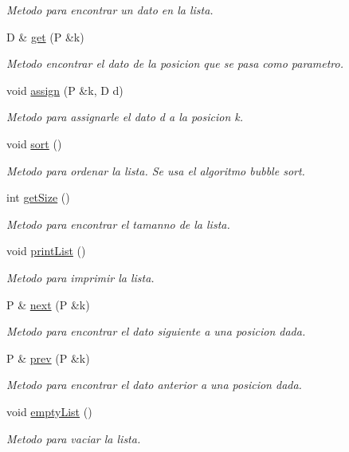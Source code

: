 \begin{DoxyCompactItemize}
\begin{DoxyCompactList}\small\item\em Metodo para encontrar un dato en la lista. \end{DoxyCompactList}\item 
D \& \hyperlink{classListWithArray_a716a279651d30b3fca9df3506ed77535}{get} (P \&k)
\begin{DoxyCompactList}\small\item\em Metodo encontrar el dato de la posicion que se pasa como parametro. \end{DoxyCompactList}\item 
void \hyperlink{classListWithArray_ad673838a35904292aca7ef78d64fceca}{assign} (P \&k, D d)
\begin{DoxyCompactList}\small\item\em Metodo para assignarle el dato d a la posicion k. \end{DoxyCompactList}\item 
void \hyperlink{classListWithArray_a1a0ec4ab4a8fcb1a20568445ad892c9a}{sort} ()
\begin{DoxyCompactList}\small\item\em Metodo para ordenar la lista. Se usa el algoritmo bubble sort. \end{DoxyCompactList}\item 
int \hyperlink{classListWithArray_ae7a071bcdde9ddbf4c40a716f5a09434}{get\+Size} ()
\begin{DoxyCompactList}\small\item\em Metodo para encontrar el tamanno de la lista. \end{DoxyCompactList}\item 
void \hyperlink{classListWithArray_a515ea38cb40ba7b0c9df98825b2dd270}{print\+List} ()
\begin{DoxyCompactList}\small\item\em Metodo para imprimir la lista. \end{DoxyCompactList}\item 
P \& \hyperlink{classListWithArray_a65ef8c78e19dfa00e58c3e92f1be6fb1}{next} (P \&k)
\begin{DoxyCompactList}\small\item\em Metodo para encontrar el dato siguiente a una posicion dada. \end{DoxyCompactList}\item 
P \& \hyperlink{classListWithArray_aee46046c55e1e0ee1f37b5e1a7aa0702}{prev} (P \&k)
\begin{DoxyCompactList}\small\item\em Metodo para encontrar el dato anterior a una posicion dada. \end{DoxyCompactList}\item 
void \hyperlink{classListWithArray_a2179e228f285cc29b46bd5d13ba0b4ed}{empty\+List} ()
\begin{DoxyCompactList}\small\item\em Metodo para vaciar la lista. \end{DoxyCompactList}\end{DoxyCompactItemize}
